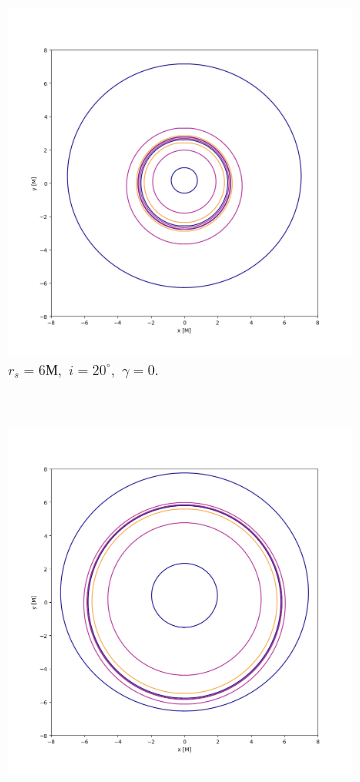 \begin{figure}[!htb]
	\centering
	\begin{subfigure}{6cm}
		\hspace{-1.2cm}
		\includegraphics[scale = 0.32]{WH_20_deg_r6_gamma_0.png}
		\caption{$r_s = 6М,\,\, i = 20^\circ,\,\,\gamma = 0$.}
	\end{subfigure}\,\,\,
	\begin{subfigure}{6cm}
		\hspace{-0.7cm}
		\includegraphics[scale = 0.32]{WH_20_deg_r6_gamma_3.png}

\end{subfigure}
\end{figure}
